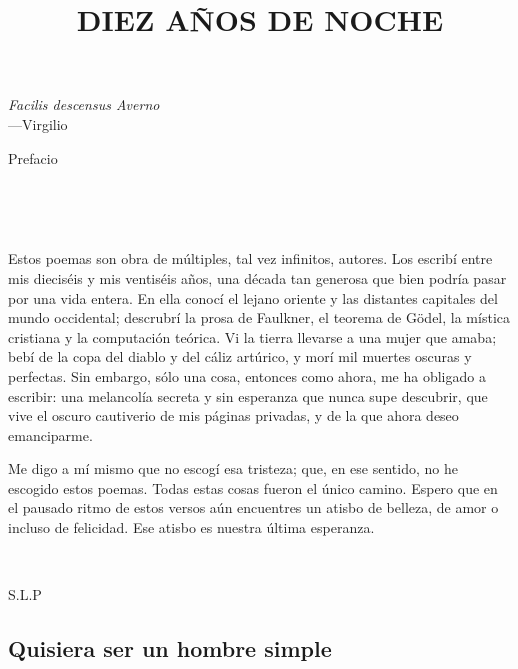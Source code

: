 \documentclass[a4paper, 12pt]{article}
\title{DIEZ AÑOS DE NOCHE}
\begin{document}
\maketitle

\pagebreak

\hspace*{\fill}\textit{Facilis descensus Averno}\\
\hspace*{\fill}—Virgilio

\pagebreak
\tableofcontents
\pagebreak
\Huge
\centerline{Prefacio}
\normalsize

~

~ 

Estos poemas son obra de múltiples, tal vez infinitos, autores. Los escribí
entre mis dieciséis y mis ventiséis años, una década tan generosa que bien
podría pasar por una vida entera. En ella conocí el lejano oriente y las
distantes capitales del mundo occidental; descrubrí la prosa de Faulkner, el
teorema de Gödel, la mística cristiana y la computación teórica. Vi la
tierra llevarse a una mujer que amaba; bebí de la copa del diablo y del cáliz
artúrico, y morí mil muertes oscuras y perfectas. Sin embargo, sólo una cosa,
entonces como ahora, me ha obligado a escribir: una melancolía secreta y sin
esperanza que nunca supe descubrir, que vive el oscuro cautiverio de mis
páginas privadas, y de la que ahora deseo emanciparme. 

Me digo a mí mismo que no escogí esa tristeza; que, en ese sentido, no he
escogido estos poemas. Todas estas cosas fueron el único camino. Espero que en
el pausado ritmo de estos versos aún encuentres un atisbo de belleza, de amor o
incluso de felicidad. Ese atisbo es nuestra última esperanza.
~ 

~

\hspace*{\fill}S.L.P
~

\pagebreak

\subsection{Quisiera ser un hombre simple}
~
\end{document}
